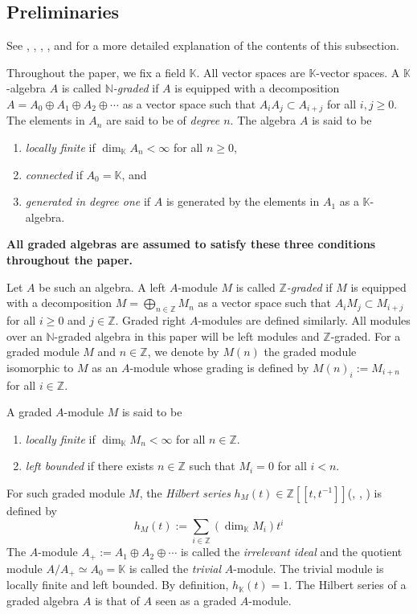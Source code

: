 \documentclass[reqno]{amsart}
\newcommand{\Nnat}{\mathbb{N}}
\newcommand{\Zint}{\mathbb{Z}}
\newcommand{\bbK}{\mathbb{K}}
\numberwithin{equation}{section}
\theoremstyle{plain}
\theoremstyle{definition}
\begin{document}
\subsection{Preliminaries}\label{prelim}

See \cite{Kabbaj}, \cite{McConnellRobson}, \cite{PositselskiPolishchuk}, \cite{ReyesRogalski}, \cite{RogalskiAS} and \cite{StephensonZhang} for a more detailed explanation of the contents of this subsection. 

Throughout the paper, we fix a field $\bbK$. All vector spaces are $\bbK$-vector spaces. A $\bbK$-algebra $A$ is called \emph{$\Nnat$-graded} if $A$ is equipped with a decomposition $A=A_0\oplus A_1\oplus A_2\oplus\cdots$ as a vector space such that $A_iA_j\subset A_{i+j}$ for all $i, j\geq0$. The elements in $A_n$ are said to be of \emph{degree $n$}. The algebra $A$ is said to be 
\begin{enumerate}
    \item \emph{locally finite} if $\dim_\bbK A_n<\infty$ for all $n\geq0$,
    \item \emph{connected} if $A_0=\bbK$, and
    \item \emph{generated in degree one} if $A$ is generated by the elements in $A_1$ as a $\bbK$-algebra.
\end{enumerate}
\textbf{All graded algebras are assumed to satisfy these three conditions throughout the paper.}

Let $A$ be such an algebra. A left $A$-module $M$ is called \emph{$\Zint$-graded} if $M$ is equipped with a decomposition $M=\bigoplus_{n\in\mathbb{Z}}M_n$ as a vector space such that $A_iM_j\subset M_{i+j}$ for all $i\geq0$ and $j\in\mathbb{Z}$. Graded right $A$-modules are defined similarly. All modules over an $\Nnat$-graded algebra in this paper will be left modules and $\Zint$-graded. For a graded module $M$ and $n\in\mathbb{Z}$, we denote by $M(n)$ the graded module isomorphic to $M$ as an $A$-module whose grading is defined by $M(n)_i:=M_{i+n}$ for all $i\in\mathbb{Z}$.

A graded $A$-module $M$ is said to be 
\begin{enumerate}
    \item \emph{locally finite} if $\dim_\bbK M_n<\infty$ for all $n\in\mathbb{Z}$.
    \item \emph{left bounded} if there exists $n\in\mathbb{Z}$ such that $M_i=0$ for all $i<n$.
\end{enumerate}
For such graded module $M$, the \emph{Hilbert series} $h_M(t)\in\Zint[[t, t^{-1}]]$(\cite{ArtinTateVandenBergh}, \cite{StephensonZhang}, \cite{PositselskiPolishchuk}) is defined by
$$h_M(t):=\sum_{i\in\mathbb{Z}}(\dim_\bbK M_i)t^i$$
The $A$-module $A_+:=A_1\oplus A_2\oplus\cdots$ is called the \emph{irrelevant ideal} and the quotient module $A/A_+\simeq A_0=\bbK$ is called the \emph{trivial} $A$-module. The trivial module is locally finite and left bounded. By definition, $h_\bbK(t)=1$. The Hilbert series of a graded algebra $A$ is that of $A$ seen as a graded $A$-module.
\end{document}
